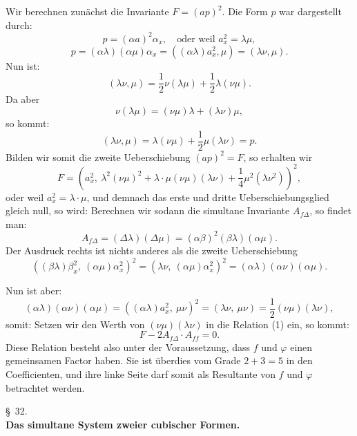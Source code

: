 Wir berechnen zunächst die Invariante $F = (ap)^2$. Die Form $p$ war
dargestellt durch:
\[
p = (\alpha a)^2 \alpha_x, \quad \text{oder weil } a_x^2 = \lambda\mu,
\]
\[
p = (\alpha\lambda)(\alpha\mu)\alpha_x = ((\alpha\lambda)a_x^2, \mu) = (\lambda\nu, \mu).
\]
Nun ist:
\[
(\lambda\nu, \mu) = \frac{1}{2}\nu(\lambda\mu) + \frac{1}{2}\lambda(\nu\mu).
\]
Da aber
\[
\nu(\lambda\mu) = (\nu\mu)\lambda + (\lambda\nu)\mu,
\]
so kommt:
\[
(\lambda\nu, \mu) = \lambda(\nu\mu) + \frac{1}{2}\mu(\lambda\nu) = p.
\]
Bilden wir somit die zweite Ueberschiebung $(ap)^2 = F$, so erhalten wir
\[
F = \left(a_x^2, \ \lambda^2(\nu\mu)^2 + \lambda\cdot\mu(\nu\mu)(\lambda\nu) + \frac{1}{4}\mu^2(\lambda\nu^2)\right)^2,
\]
oder weil $a_x^2 = \lambda\cdot\mu$, und demnach das erste und dritte
Ueberschiebungsglied gleich null, so wird:
Berechnen wir sodann die simultane Invariante $A_{f\Delta}$, so findet man:
\[
A_{f\Delta} = (\Delta\lambda)(\Delta\mu) = (\alpha\beta)^2(\beta\lambda)(\alpha\mu).
\]
Der Ausdruck rechts ist nichts anderes als die zweite Ueberschiebung
\[
((\beta\lambda)\beta_x^2, \ (\alpha\mu)\alpha_x^2)^2 = (\lambda\nu, \ (\alpha\mu)\alpha_x^2)^2 = (\alpha\lambda)(\alpha\nu)(\alpha\mu).
\]



Nun ist aber:
\[
(\alpha\lambda)(\alpha\nu)(\alpha\mu) = ((\alpha\lambda)a_x^2, \ \mu\nu)^2 = (\lambda\nu, \ \mu\nu) = \frac{1}{2}(\nu\mu)(\lambda\nu),
\]
somit:
Setzen wir den Werth von $(\nu\mu)(\lambda\nu)$ in die Relation (1) ein, so
kommt:
\[
F - 2A_{f\Delta}\cdot A_{ff} = 0.
\]
Diese Relation besteht also unter der Voraussetzung, dass $f$ und $\varphi$
einen gemeinsamen Factor haben. Sie ist überdies vom Grade $2 + 3 = 5$ in
den Coefficienten, und ihre linke Seite darf somit als Resultante von $f$
und $\varphi$ betrachtet werden.

\begin{center}
\S~32. \\
\textbf{Das simultane System zweier cubischer Formen.}
\end{center}

